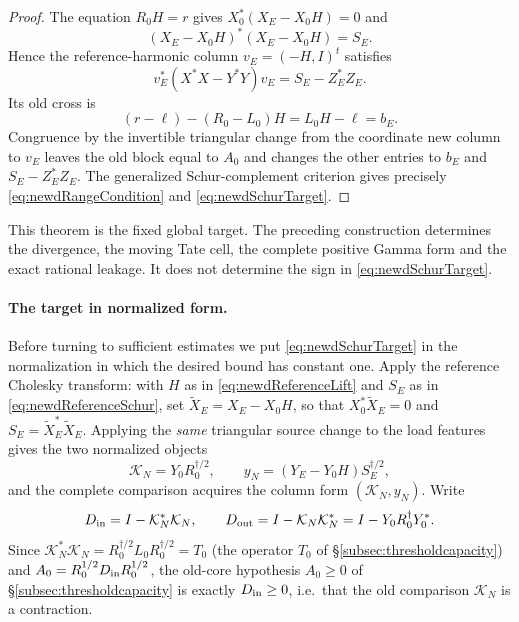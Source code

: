 \documentclass[11pt]{amsart}
\theoremstyle{definition}
\theoremstyle{remark}
\begin{document}
\begin{proof}
The equation $R_0H=r$ gives
$X_0^*(X_E-X_0H)=0$ and
\[
 (X_E-X_0H)^*(X_E-X_0H)=S_E.
\]
Hence the reference-harmonic column $v_E=(-H,I)^t$ satisfies
\[
 v_E^*(X^*X-Y^*Y)v_E=S_E-Z_E^*Z_E.
\]
Its old cross is
\[
 (r-\ell)-(R_0-L_0)H=L_0H-\ell=b_E.
\]
Congruence by the invertible triangular change from the coordinate new
column to $v_E$ leaves the old block equal to $A_0$ and changes the other
entries to $b_E$ and $S_E-Z_E^*Z_E$.  The generalized Schur-complement
criterion gives precisely \eqref{eq:newdRangeCondition} and
\eqref{eq:newdSchurTarget}.
\end{proof}

This theorem is the fixed global target.  The preceding construction
determines the divergence, the moving Tate cell, the complete positive Gamma
form and the exact rational leakage.  It does not determine the sign in
\eqref{eq:newdSchurTarget}.

\paragraph{The target in normalized form.}
Before turning to sufficient estimates we put \eqref{eq:newdSchurTarget} in
the normalization in which the desired bound has constant one.  Apply the
reference Cholesky transform: with \(H\) as in
\eqref{eq:newdReferenceLift} and \(S_E\) as in \eqref{eq:newdReferenceSchur},
set \(\widetilde X_E=X_E-X_0H\), so that \(X_0^*\widetilde X_E=0\) and
\(S_E=\widetilde X_E^*\widetilde X_E\).  Applying the \emph{same} triangular
source change to the load features gives the two normalized objects
\begin{equation}\label{eq:newdNormalizedComparison}
 \mathcal K_N=Y_0R_0^{\dagger/2},
 \qquad
 y_N=(Y_E-Y_0H)S_E^{\dagger/2},
\end{equation}
and the complete comparison acquires the column form \((\mathcal K_N,y_N)\).
Write
\begin{equation}\label{eq:newdInOutDefects}
 D_{\rm in}=I-\mathcal K_N^*\mathcal K_N,
 \qquad
 D_{\rm out}=I-\mathcal K_N\mathcal K_N^*
            =I-Y_0R_0^\dagger Y_0^* .
\end{equation}
Since \(\mathcal K_N^*\mathcal K_N=R_0^{\dagger/2}L_0R_0^{\dagger/2}=T_0\)
(the operator \(T_0\) of \S\ref{subsec:thresholdcapacity}) and
\(A_0=R_0^{1/2}D_{\rm in}R_0^{1/2}\), the old-core hypothesis \(A_0\ge0\) of
\S\ref{subsec:thresholdcapacity} is exactly \(D_{\rm in}\ge0\), i.e.\ that the
old comparison \(\mathcal K_N\) is a contraction.
\end{document}

